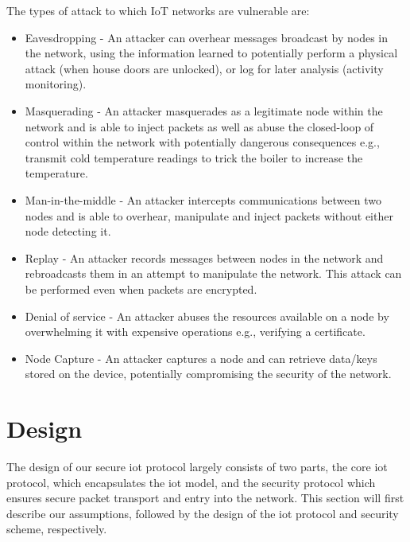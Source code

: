 \documentclass[conference]{./sty/IEEEtran}
\begin{document}
The types of attack to which IoT networks are vulnerable are:
\begin{itemize}
  \item Eavesdropping - An attacker can overhear messages broadcast by nodes in the network, using the information learned to potentially perform a physical attack (when house doors are unlocked), or log for later analysis (activity monitoring).  
  \item Masquerading - An attacker masquerades as a legitimate node within the network and is able to inject packets as well as abuse the closed-loop of control within the network with potentially dangerous consequences e.g., transmit cold temperature readings to trick the boiler to increase the temperature.
  \item Man-in-the-middle - An attacker intercepts communications between two nodes and is able to overhear, manipulate and inject packets without either node detecting it. 
  \item Replay - An attacker records messages between nodes in the network and rebroadcasts them in an attempt to manipulate the network. This attack can be performed even when packets are encrypted. 
  \item Denial of service - An attacker abuses the resources available on a node by overwhelming it with expensive operations e.g., verifying a certificate.
  \item Node Capture - An attacker captures a node and can retrieve data/keys stored on the device, potentially compromising the security of the network.
\end{itemize}


\section{Design} %
\label{sec:design}
The design of our secure iot protocol largely consists of two parts, the core iot protocol, which encapsulates the iot model, and the security protocol which ensures secure packet transport and entry into the network. This section will first describe our assumptions, followed by the design of the iot protocol and security scheme, respectively.
\end{document}
